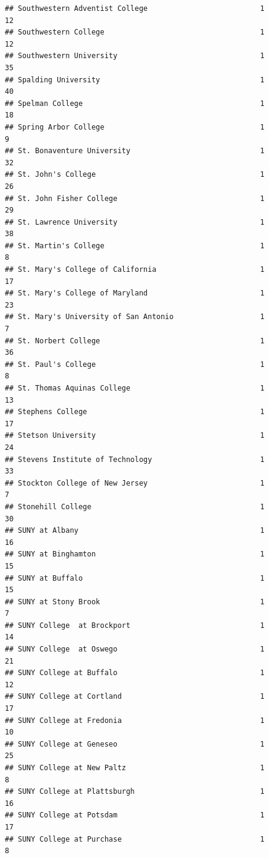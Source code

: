 \documentclass[
]{article}
\begin{document}
\begin{verbatim}
## Southwestern Adventist College                          1          12
## Southwestern College                                    1          12
## Southwestern University                                 1          35
## Spalding University                                     1          40
## Spelman College                                         1          18
## Spring Arbor College                                    1           9
## St. Bonaventure University                              1          32
## St. John's College                                      1          26
## St. John Fisher College                                 1          29
## St. Lawrence University                                 1          38
## St. Martin's College                                    1           8
## St. Mary's College of California                        1          17
## St. Mary's College of Maryland                          1          23
## St. Mary's University of San Antonio                    1           7
## St. Norbert College                                     1          36
## St. Paul's College                                      1           8
## St. Thomas Aquinas College                              1          13
## Stephens College                                        1          17
## Stetson University                                      1          24
## Stevens Institute of Technology                         1          33
## Stockton College of New Jersey                          1           7
## Stonehill College                                       1          30
## SUNY at Albany                                          1          16
## SUNY at Binghamton                                      1          15
## SUNY at Buffalo                                         1          15
## SUNY at Stony Brook                                     1           7
## SUNY College  at Brockport                              1          14
## SUNY College  at Oswego                                 1          21
## SUNY College at Buffalo                                 1          12
## SUNY College at Cortland                                1          17
## SUNY College at Fredonia                                1          10
## SUNY College at Geneseo                                 1          25
## SUNY College at New Paltz                               1           8
## SUNY College at Plattsburgh                             1          16
## SUNY College at Potsdam                                 1          17
## SUNY College at Purchase                                1           8

\end{verbatim}
\end{document}

